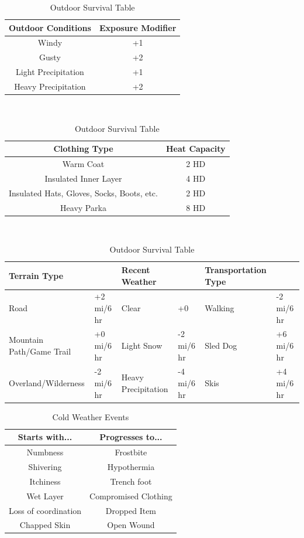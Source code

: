\documentclass[notitlepage]{article}
\begin{document}
\begin{multicols}{2}
\begin{table}[t]
  \centering \large
  \begin{tabular}{|c||c|}
    \hline Outdoor Conditions & Exposure Modifier \\ \hline
    Windy & +1 \\
    Gusty & +2 \\
    Light Precipitation & +1 \\
    Heavy Precipitation & +2 \\ \hline
  \end{tabular} \\

  \begin{tabular}{|c||c|}
    \hline Clothing Type & Heat Capacity \\ \hline
    Warm Coat & 2 HD \\
    Insulated Inner Layer & 4 HD \\
    Insulated Hats, Gloves, Socks, Boots, etc. & 2 HD \\
    Heavy Parka & 8 HD \\ \hline
  \end{tabular} \\

  \begin{tabular}{|p{}|l||p{}|l||p{}|l|}
    \hline Terrain Type & & Recent Weather & & Transportation Type & \\ \hline
    Road & +2 mi/6 hr & Clear& +0 & Walking & -2 mi/6 hr \\
    Mountain Path/Game Trail & +0 mi/6 hr & Light Snow & -2 mi/6 hr & Sled Dog & +6 mi/6 hr \\
    Overland/Wilderness & -2 mi/6 hr & Heavy Precipitation & -4 mi/6 hr & Skis & +4 mi/6 hr \\ \hline
  \end{tabular}
  \caption{Outdoor Survival Table}
  \label{tab:outdoor-survival}
\end{table}

\begin{table}[t]
  \centering
  \begin{tabular}{|c|c|}
    \hline Starts with... & Progresses to... \\ \hline
    Numbness & Frostbite \\
    Shivering & Hypothermia \\
    Itchiness & Trench foot \\
    Wet Layer & Compromised Clothing \\ 
    Loss of coordination & Dropped Item \\
    Chapped Skin & Open Wound \\ \hline
  \end{tabular}
  \caption{Cold Weather Events}
  \label{tab:cold-events}
\end{table}



\end{multicols}
\end{document}
